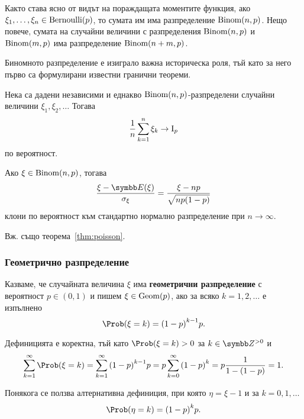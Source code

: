 \documentclass[numbers=endperiod, bibliography=totocnumbered]{scrartcl}
\begin{document}
Както става ясно от видът на пораждащата моментите функция, ако \( \xi_1, \ldots, \xi_n \in \operatorname{Bernoulli}(p) \), то сумата им има разпределение \( \operatorname{Binom}(n, p) \). Нещо повече, сумата на случайни величини с разпределения \( \operatorname{Binom}(n, p) \) и \( \operatorname{Binom}(m, p) \) има разпределение \( \operatorname{Binom}(n + m, p) \).

Биномното разпределение е изиграло важна историческа роля, тъй като за него първо са формулирани известни гранични теореми.

\begin{theorem}\label{thm:bernoulli}
  Нека са дадени независими и еднакво \( \operatorname{Binom}(n, p) \)-разпределени случайни величини \( \xi_1, \xi_2, \ldots \) Тогава
  \begin{equation*}
    \frac 1 n \sum_{k=1}^n \xi_k
    \to
    \operatorname{I}_p
  \end{equation*}
  по вероятност.
\end{theorem}

\begin{theorem}\label{thm:moivre_laplace}
  Ако \( \xi \in \operatorname{Binom}(n, p) \), тогава
  \begin{equation*}
    \frac {\xi - \Expect(\xi)} {\sigma_\xi}
    =
    \frac {\xi - np} {\sqrt{np(1-p)}}
  \end{equation*}
  клони по вероятност към стандартно нормално разпределение при \( n \to \infty \).
\end{theorem}

Вж. също теорема~\ref{thm:poisson}.

\subsubsection{Геометрично разпределение}\label{dist:geom}

\begin{definition}
  Казваме, че случайната величина \( \xi \) има \textbf{геометрични разпределение} с вероятност \( p \in (0, 1) \) и пишем \( \xi \in \operatorname{Geom}(p) \), ако за всяко \( k = 1, 2, \ldots \) е изпълнено
  \begin{equation*}
    \Prob(\xi = k) = {(1-p)}^{k-1} p.
  \end{equation*}

  Дефиницията е коректна, тъй като \( \Prob(\xi = k) > 0 \) за \( k \in \ZPos \) и
  \begin{equation*}
    \sum_{k=1}^\infty \Prob(\xi = k)
    =
    \sum_{k=1}^\infty {(1-p)}^{k-1} p
    =
    p \sum_{k=0}^\infty {(1-p)}^k
    =
    p \frac 1 {1-(1-p)}
    =
    1.
  \end{equation*}

  Понякога се ползва алтернативна дефиниция, при която \( \eta = \xi - 1 \) и за \( k = 0, 1, \ldots \)
  \begin{equation*}
    \Prob(\eta = k) = {(1-p)}^k p.
  \end{equation*}
\end{definition}
\end{document}
